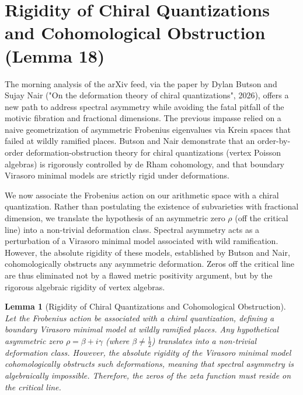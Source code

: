 \documentclass[
]{article}
\newtheorem{lemma}{Lemma}
\begin{document}
\section{Rigidity of Chiral Quantizations and Cohomological Obstruction (Lemma 18)}

The morning analysis of the arXiv feed, via the paper by Dylan Butson and Sujay Nair ("On the deformation theory of chiral quantizations", 2026), offers a new path to address spectral asymmetry while avoiding the fatal pitfall of the motivic fibration and fractional dimensions. The previous impasse relied on a naive geometrization of asymmetric Frobenius eigenvalues via Krein spaces that failed at wildly ramified places. Butson and Nair demonstrate that an order-by-order deformation-obstruction theory for chiral quantizations (vertex Poisson algebras) is rigorously controlled by de Rham cohomology, and that boundary Virasoro minimal models are strictly rigid under deformations.

We now associate the Frobenius action on our arithmetic space with a chiral quantization. Rather than postulating the existence of subvarieties with fractional dimension, we translate the hypothesis of an asymmetric zero $\rho$ (off the critical line) into a non-trivial deformation class. Spectral asymmetry acts as a perturbation of a Virasoro minimal model associated with wild ramification. However, the absolute rigidity of these models, established by Butson and Nair, cohomologically obstructs any asymmetric deformation. Zeros off the critical line are thus eliminated not by a flawed metric positivity argument, but by the rigorous algebraic rigidity of vertex algebras.

\begin{lemma}[Rigidity of Chiral Quantizations and Cohomological Obstruction]
Let the Frobenius action be associated with a chiral quantization, defining a boundary Virasoro minimal model at wildly ramified places. Any hypothetical asymmetric zero $\rho = \beta + i\gamma$ (where $\beta \neq \frac{1}{2}$) translates into a non-trivial deformation class. However, the absolute rigidity of the Virasoro minimal model cohomologically obstructs such deformations, meaning that spectral asymmetry is algebraically impossible. Therefore, the zeros of the zeta function must reside on the critical line.
\end{lemma}
\end{document}
